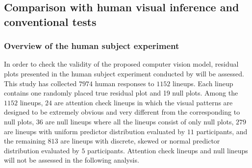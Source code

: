 \documentclass[]{interact}
\theoremstyle{plain}%
\theoremstyle{definition}
\theoremstyle{remark}
\begin{document}
\begin{table}

\caption{\label{tab:performance-sub}The training and test performance of the $32 \times 32$ model presented with different model violations.}
\centering
{}
\end{table}

\subsection{Comparison with human visual inference and conventional
tests}\label{comparison-with-human-visual-inference-and-conventional-tests}

\subsubsection{Overview of the human subject
experiment}\label{overview-of-the-human-subject-experiment}

In order to check the validity of the proposed computer vision model,
residual plots presented in the human subject experiment conducted by
\citet{li2023plot} will be assessed. This study has collected \(7974\)
human responses to \(1152\) lineups. Each lineup contains one randomly
placed true residual plot and 19 null plots. Among the \(1152\) lineups,
\(24\) are attention check lineups in which the visual patterns are
designed to be extremely obvious and very different from the
corresponding to null plots, \(36\) are null lineups where all the
lineups consist of only null plots, \(279\) are lineups with uniform
predictor distribution evaluated by \(11\) participants, and the
remaining \(813\) are lineups with discrete, skewed or normal predictor
distribution evaluated by \(5\) participants. Attention check lineups
and null lineups will not be assessed in the following analysis.
\end{document}
